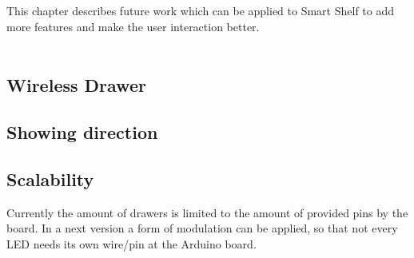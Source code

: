 This chapter describes future work which can be applied to Smart Shelf to add more features and make the user interaction better. 
\\
\\
\subsection{Wireless Drawer}


\subsection{Showing direction}



\subsection{Scalability}
Currently the amount of drawers is limited to the amount of provided pins by the board. 
In a next version a form of modulation can be applied, so that not every LED needs its own wire/pin at the Arduino board. 